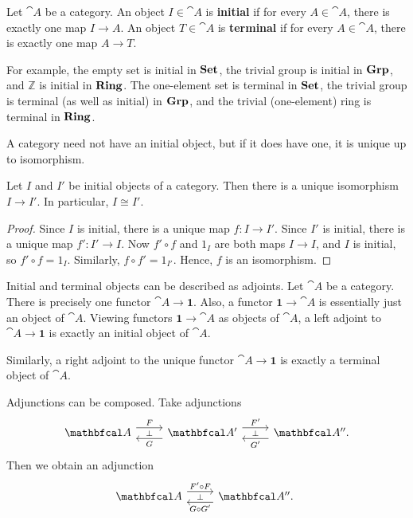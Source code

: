 \begin{definition}
    Let $\cat{A}$ be a category. An object $I\in\cat{A}$ is \textbf{initial} if for every $A\in\cat{A}$, there is exactly one map $I\to A$. An object $T\in\cat{A}$ is \textbf{terminal} if for every $A\in\cat{A}$, there is exactly one map $A\to T$.
\end{definition}
    For example, the empty set is initial in $\mathbf{Set}$, the trivial group is initial in $\mathbf{Grp}$, and $\mathbb{Z}$ is initial in $\mathbf{Ring}$. The one-element set is terminal in $\mathbf{Set}$, the trivial group is terminal (as well as initial) in $\mathbf{Grp}$, and the trivial (one-element) ring is terminal in $\mathbf{Ring}$.\par
    A category need not have an initial object, but if it does have one, it is unique up to isomorphism.
\begin{lemma}
    Let $I$ and $I'$ be initial objects of a category. Then there is a unique isomorphism $I\to I'$. In particular, $I\cong I'$.
\end{lemma}
\begin{proof}
    Since $I$ is initial, there is a unique map $f: I\to I'$. Since $I'$ is initial, there is a unique map $f':I'\to I$. Now $f'\circ f$ and $1_I$ are both maps $I\to I$, and $I$ is initial, so $f'\circ f=1_I$. Similarly, $f\circ f'=1_{I'}$. Hence, $f$ is an isomorphism.
\end{proof}

\begin{example}
    Initial and terminal objects can be described as adjoints. Let $\cat{A}$ be a category. There is precisely one functor $\cat{A} \to \textbf{1}$. Also, a functor $ \textbf{1}\to\cat{A}$ is essentially just an object of $\cat{A}$. Viewing functors $ \textbf{1}\to\cat{A}$ as objects of $\cat{A}$, a left adjoint to $\cat{A}\to \textbf{1}$ is exactly an initial object of $\cat{A}$.\par
    Similarly, a right adjoint to the unique functor $\cat{A}\to \textbf{1}$ is exactly a terminal object of $\cat{A}$.
\end{example}

\begin{remark}
    Adjunctions can be composed. Take adjunctions
    \begin{equation*}
    \begin{tikzcd}
        \cat{A}
        \arrow[r, shift left=2, "F"] &
        \cat{A'}
        \arrow[l, shift left=2, "G", "\bot"'] \arrow[r, shift left=2, "F'"] &
        \cat{A''.}
        \arrow[l, shift left=2, "G'", "\bot"']
    \end{tikzcd}
    \end{equation*}
    Then we obtain an adjunction
    \begin{equation*}
    \begin{tikzcd}
        \cat{A} \arrow[r, shift left=2, "F'\circ F"] &
        \cat{A''.} \arrow[l, shift left=2, "G\circ G'", "\bot"'] \
    \end{tikzcd}
    \end{equation*}
\end{remark}

